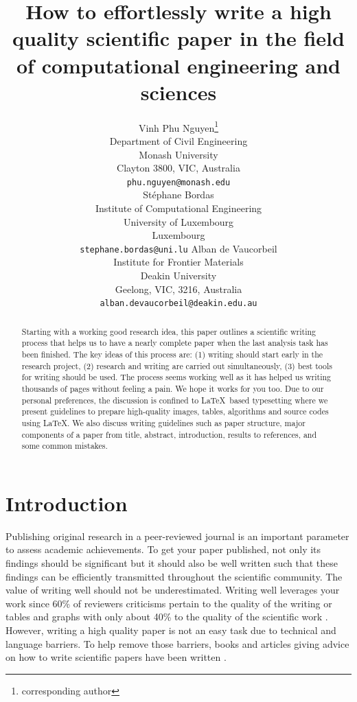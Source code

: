 \documentclass[authoryear,12pta4paper,fleqn]{article}
\title{\textbf{How to effortlessly write a high quality scientific paper in the field of computational engineering and sciences }}
\author{
    Vinh Phu Nguyen\thanks{corresponding author} \\
    Department of Civil Engineering\\
     Monash University\\
     Clayton 3800, VIC, Australia\\
    \texttt{phu.nguyen@monash.edu} \\
    \And
    St\'{e}phane Bordas \\
    Institute of Computational Engineering\\
     University of Luxembourg\\
     Luxembourg\\
    \texttt{stephane.bordas@uni.lu} 
    \And
    Alban de Vaucorbeil\\
    Institute for Frontier Materials\\
    Deakin University\\
    Geelong, VIC, 3216, Australia\\
    \texttt{alban.devaucorbeil@deakin.edu.au} 
}
\numberwithin{equation}{section}
\theoremstyle{remark}
\begin{document}
\maketitle

\begin{abstract}
Starting with a working good research idea, this paper outlines a scientific writing process that helps us to have a nearly complete paper when the last analysis task has been finished.  The key ideas of this process are: (1) writing should start early in the research project, (2) research and writing are carried out simultaneously, (3) best tools for writing should be used.  The process seems working well as it has helped us writing thousands of pages without feeling a pain. We hope it works for you too.  Due to our personal preferences, the discussion is confined to \LaTeX\ based typesetting where we present guidelines to prepare high-quality images, tables, algorithms and source codes using \LaTeX. We also discuss writing guidelines such as paper structure, major components of a paper from title, abstract, introduction, results to references, and some common mistakes.
\end{abstract}





\tableofcontents

\section{Introduction}

\showthe\textwidth %


Publishing original research in a peer-reviewed  journal is an important parameter to assess academic achievements. To get your paper published, not only its findings should be significant but it should also be well written such that these findings can be efficiently transmitted throughout the scientific community. The value of writing well should not be underestimated. Writing well leverages your work since 60\% of reviewers criticisms pertain to the quality of the writing or tables and graphs with only about 40\% to the quality of the scientific work \citep{iles1997guidebook}.
However, writing a high quality paper is not an easy task due to technical and language barriers. To help remove those barriers, books and articles giving advice on how to write scientific papers have been written \citep{white1972elements,day1998write,ashby2000write,plaxco2010art}. 
\end{document}
